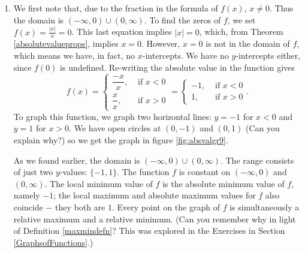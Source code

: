 {
\begin{enumerate}

\item  We first note that, due to the fraction in the formula of $f(x)$, $x \neq 0$.  Thus the domain is $(-\infty, 0) \cup (0, \infty)$.  To find the zeros of $f$, we set $f(x) = \frac{|x|}{x} = 0$.  This last equation implies $|x|=0$, which, from Theorem \ref{absolutevalueprops}, implies $x=0$.  However, $x=0$ is not in the domain of $f$, which means we have, in fact, no $x$-intercepts.  We have no $y$-intercepts either, since $f(0)$ is undefined.  Re-writing the absolute value in the function gives
\[
   f(x) = \begin{cases}
		   \dfrac{-x}{x}, & \mbox{ if }  x <0  \\[8pt]
		   \dfrac{x}{x},  & \mbox{ if }  x > 0
		  \end{cases}  = 
		  \begin{cases}
		    -1, & \mbox{ if }  x < 0 \\
		     1, & \mbox{ if }  x >0
		  \end{cases}.
\]
To graph this function, we graph two horizontal lines:  $y = -1$ for $x < 0$ and $y = 1$ for $x > 0$.  We have open circles at $(0,-1)$ and $(0,1)$ (Can you explain why?) so we get the graph in figure \ref{fig:absvalgr9}.


As we found earlier, the domain is $(-\infty, 0)\cup(0,\infty)$.  The range consists of just two $y$-values: $\{-1,1\}$.  The function $f$ is constant on $(-\infty,0)$ and $(0,\infty)$.  The local minimum value of $f$ is the absolute minimum value of $f$, namely $-1$;  the local maximum and absolute maximum values for $f$ also coincide $-$ they both are $1$.  Every point on the graph of $f$ is simultaneously a relative maximum and a relative minimum. (Can you remember why in light of Definition \ref{maxmindefn}?  This was explored in the Exercises in Section \ref{GraphsofFunctions}.)


\end{enumerate}}
